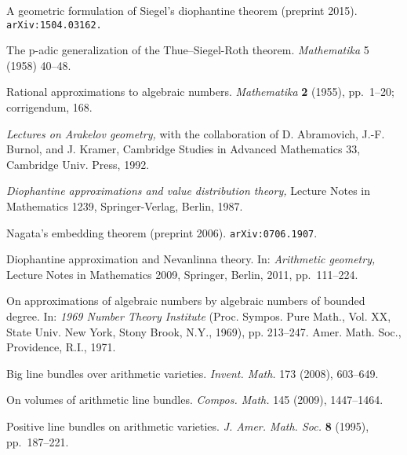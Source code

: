  A geometric formulation of Siegel's diophantine theorem
  (preprint 2015).  {\tt arXiv:1504.03162.}

 The p-adic generalization of the Thue--Siegel-Roth theorem.
  {\it Mathematika} 5 (1958) 40--48.

 Rational approximations to algebraic numbers.
  {\it Mathematika\/} {\bf 2} (1955), pp.~1--20; corrigendum, 168.

 {\it Lectures on Arakelov geometry,}
  with the collaboration of D. Abramovich, J.-F. Burnol, and J. Kramer,
  Cambridge Studies in Advanced Mathematics 33, Cambridge Univ. Press, 1992.

 {\it Diophantine approximations and value distribution theory,}
  Lecture Notes in Mathematics 1239, Springer-Verlag, Berlin, 1987.

  Nagata's embedding theorem (preprint 2006). {\tt arXiv:0706.1907}.

  Diophantine approximation and Nevanlinna theory.
  In: {\it Arithmetic geometry,} Lecture Notes in Mathematics 2009,
  Springer, Berlin, 2011, pp.~111--224.

  On approximations of algebraic numbers by algebraic numbers of bounded degree.
  In: {\it 1969 Number Theory Institute\/}
  (Proc. Sympos. Pure Math., Vol. XX, State Univ. New York, Stony Brook, N.Y.,
  1969), pp. 213--247. Amer. Math. Soc., Providence, R.I., 1971.

 Big line bundles over arithmetic varieties.
  {\it Invent. Math.} 173 (2008), 603--649.

 On volumes of arithmetic line bundles.
  {\it Compos. Math.} 145 (2009), 1447--1464.

  Positive line bundles on arithmetic varieties.
  {\it J. Amer. Math. Soc.} {\bf 8} (1995), pp.~187--221.

\endRefs

\enddocument
